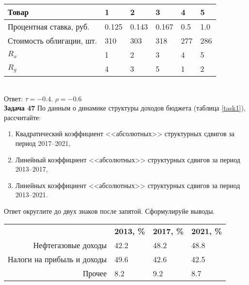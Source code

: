 \documentclass{article}
\begin{document}
\begin{minipage}{\textwidth}
\centering
\begin{tabularx}{0.8\textwidth}{lYYYYY}
\toprule
Товар & 1 & 2 & 3 & 4 & 5 \\
\midrule
Процентная ставка, руб. & 0.125 & 0.143 & 0.167 & 0.5 & 1.0 \\

Стоимость облигации, шт. & 310 & 303 & 318 & 277 & 286 \\

$R_x$ & 1 & 2 & 3 & 4 & 5 \\

$R_y$ & 4 & 3 & 5 & 1 & 2 \\
\bottomrule
\end{tabularx}
\label{task46}
\end{minipage} \\[35pt]

Ответ: $\tau = -0.4$. $\rho = -0.6$\\

\textbf{Задача 47} По данным о динамике структуры доходов бюджета (таблица \ref{task1}), рассчитайте:
\begin{enumerate}[leftmargin=40pt]
\item Квадратический коэффициент <<абсолютных>> структурных сдвигов за период 2017--2021,
\item Линейный коэффициент <<абсолютных>> структурных сдвигов за период 2013--2017,
\item Линейных коэффициент <<абсолютных>> структурных сдвигов за период 2013--2021.\medskip
\end{enumerate}

Ответ округлите до двух знаков после запятой. Сформулируйе выводы.\\

\begin{minipage}{\textwidth}
\centering
\begin{tabularx}{0.8\textwidth}{rYYY}
\toprule
 & \textbf{2013, \%} & \textbf{2017, \%} & \textbf{2021, \%} \\
\cmidrule(lr){2-2}\cmidrule(lr){3-3}\cmidrule(lr){4-4}
Нефтегазовые доходы & 42.2 & 48.2 & 48.8 \\

Налоги на прибыль и доходы & 49.6 & 42.6 & 42.5 \\

Прочее & 8.2 & 9.2 & 8.7 \\
\bottomrule
\end{tabularx}
\label{task1}
\end{minipage} \\[35pt]
\end{document}
